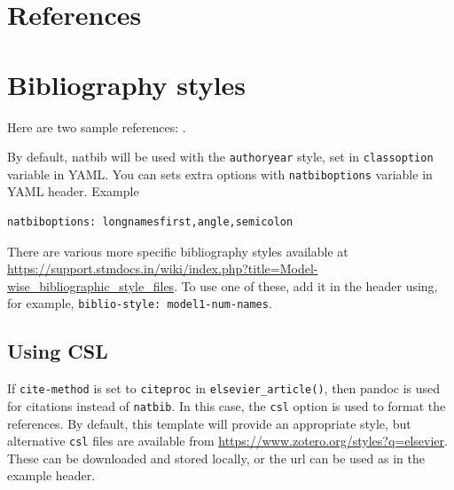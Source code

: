 \documentclass[
  super,
  preprint,
  3p]{elsarticle}
\begin{document}
\hypertarget{references}{%
\section*{References}\label{references}}

\hypertarget{bibliography-styles}{%
\section{Bibliography styles}\label{bibliography-styles}}

Here are two sample references: \citet{Feynman1963118}
\citet{Dirac1953888}.

By default, natbib will be used with the \texttt{authoryear} style, set
in \texttt{classoption} variable in YAML. You can sets extra options
with \texttt{natbiboptions} variable in YAML header. Example

\begin{verbatim}
natbiboptions: longnamesfirst,angle,semicolon
\end{verbatim}

There are various more specific bibliography styles available at
\url{https://support.stmdocs.in/wiki/index.php?title=Model-wise_bibliographic_style_files}.
To use one of these, add it in the header using, for example,
\texttt{biblio-style:\ model1-num-names}.

\hypertarget{using-csl}{%
\subsection{Using CSL}\label{using-csl}}

If \texttt{cite-method} is set to \texttt{citeproc} in
\texttt{elsevier\_article()}, then pandoc is used for citations instead
of \texttt{natbib}. In this case, the \texttt{csl} option is used to
format the references. By default, this template will provide an
appropriate style, but alternative \texttt{csl} files are available from
\url{https://www.zotero.org/styles?q=elsevier}. These can be downloaded
and stored locally, or the url can be used as in the example header.


  
\end{document}
